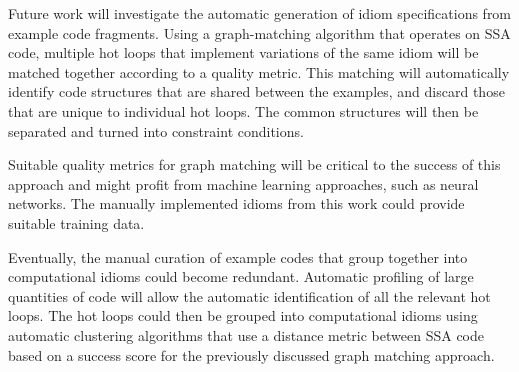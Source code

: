     Future work will investigate the automatic generation of idiom
    specifications from example code fragments.
    Using a graph-matching algorithm that operates on SSA code, multiple hot
    loops that implement variations of the same idiom will be matched together
    according to a quality metric.
    This matching will automatically identify code structures that are shared
    between the examples, and discard those that are unique to individual hot
    loops.
    The common structures will then be separated and turned into constraint
    conditions.

    Suitable quality metrics for graph matching will be critical to the success
    of this approach and might profit from machine learning approaches, such as
    neural networks.
    The manually implemented idioms from this work could provide suitable
    training data.

    Eventually, the manual curation of example codes that group together into
    computational idioms could become redundant.
    Automatic profiling of large quantities of code will allow the automatic
    identification of all the relevant hot loops.
    The hot loops could then be grouped into computational idioms using
    automatic clustering algorithms that use a distance metric between SSA code
    based on a success score for the previously discussed graph matching
    approach.
